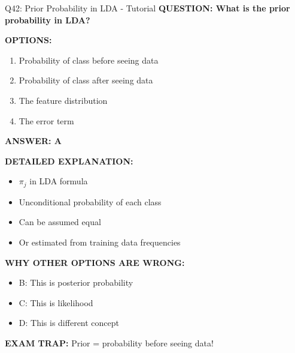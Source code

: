 \documentclass[8pt]{beamer}
\begin{document}
	\begin{frame}{Q42: Prior Probability in LDA - Tutorial}
		\fontsize{6.5}{7.5}\selectfont
		\textbf{QUESTION: What is the prior probability in LDA?}
		
		\vspace{0.1cm}
		\textbf{OPTIONS:}
		\begin{enumerate}
			\item Probability of class before seeing data
			\item Probability of class after seeing data
			\item The feature distribution
			\item The error term
		\end{enumerate}
		
		\vspace{0.1cm}
		\textcolor{myblue}{\textbf{ANSWER: A}}
		
		\vspace{0.1cm}
		\textbf{DETAILED EXPLANATION:}
		\begin{itemize}
			\item $\pi_j$ in LDA formula
			\item Unconditional probability of each class
			\item Can be assumed equal
			\item Or estimated from training data frequencies
		\end{itemize}
		
		\vspace{0.1cm}
		\textcolor{myred}{\textbf{WHY OTHER OPTIONS ARE WRONG:}}
		\begin{itemize}
			\item \textcolor{myred}{B:} This is posterior probability
			\item \textcolor{myred}{C:} This is likelihood
			\item \textcolor{myred}{D:} This is different concept
		\end{itemize}
		
		\textcolor{myred}{\textbf{EXAM TRAP:}} Prior = \textcolor{myblue}{probability before seeing data}!
	\end{frame}
	
\end{document}
